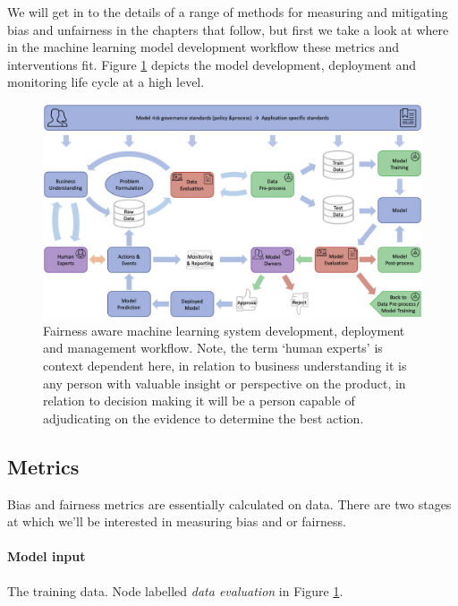 We will get in to the details of a range of methods for measuring and mitigating bias and unfairness in the chapters that follow, but first we take a look at where in the machine learning model development workflow these metrics and interventions fit. Figure \ref{fig_Workflow} depicts the model development, deployment and monitoring life cycle at a high level.
%
\begin{figure}[h!]
\centering
\includegraphics[width=\textwidth]{02_EthicalDevelopment/figures/Fig_Workflow.png}
\caption[Fairness aware machine learning system development, deployment and management workflow.]{Fairness aware machine learning system development, deployment and management workflow. Note, the term `human experts' is context dependent here, in relation to business understanding it is any person with valuable insight or perspective on the product, in relation to decision making it will be a person capable of adjudicating on the evidence to determine the best action.}
\label{fig_Workflow}
\end{figure}

\subsection{Metrics}

Bias and fairness metrics are essentially calculated on data. There are two stages at which we'll be interested in measuring bias and or fairness.
%
\paragraph*{Model input} The training data. Node labelled \emph{data evaluation} in Figure \ref{fig_Workflow}.
%
